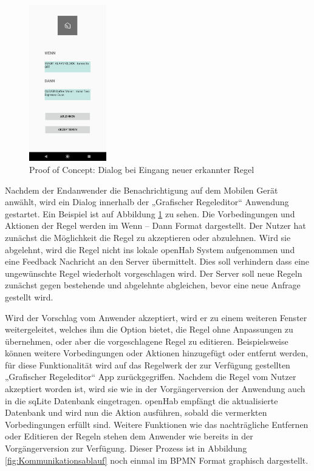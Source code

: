 \begin{figure}
  \begin{center}
    \includegraphics[width=0.3\textwidth]{figures/Appbildungen/newRuleDialog.png}
  \end{center}
  \label{fig:appdialog}
  \caption{Proof of Concept: Dialog bei Eingang neuer erkannter Regel}
\end{figure}

Nachdem der Endanwender die Benachrichtigung auf dem Mobilen Gerät anwählt, wird ein Dialog innerhalb der „Grafischer Regeleditor“ Anwendung gestartet. Ein Beispiel ist auf Abbildung \ref{fig:appdialog} zu sehen. Die Vorbedingungen und Aktionen der Regel werden im Wenn – Dann Format dargestellt. Der Nutzer hat zunächst die Möglichkeit die Regel zu akzeptieren oder abzulehnen. Wird sie abgelehnt, wird die Regel nicht ins lokale openHab System aufgenommen und eine Feedback Nachricht an den Server übermittelt. Dies soll verhindern dass eine ungewünschte Regel wiederholt vorgeschlagen wird. Der Server soll neue Regeln zunächst gegen bestehende und abgelehnte abgleichen, bevor eine neue Anfrage gestellt wird.

Wird der Vorschlag vom Anwender akzeptiert, wird er zu einem weiteren Fenster weitergeleitet, welches ihm die Option bietet, die Regel ohne Anpassungen zu übernehmen, oder aber die vorgeschlagene Regel zu editieren. Beispielsweise können weitere Vorbedingungen oder Aktionen hinzugefügt oder entfernt werden, für diese Funktionalität wird auf das Regelwerk der zur Verfügung gestellten „Grafischer Regeleditor“ App zurückgegriffen. 
Nachdem die Regel vom Nutzer akzeptiert worden ist, wird sie wie in der Vorgängerversion der Anwendung auch in die sqLite Datenbank eingetragen. openHab empfängt die aktualisierte Datenbank und wird nun die Aktion ausführen, sobald die vermerkten Vorbedingungen erfüllt sind.
Weitere Funktionen wie das nachträgliche Entfernen oder Editieren der Regeln stehen dem Anwender wie bereits in der Vorgängerversion zur Verfügung.
Dieser Prozess ist in Abbildung \ref{fig:Kommunikationsablauf} noch einmal im BPMN Format graphisch dargestellt.



